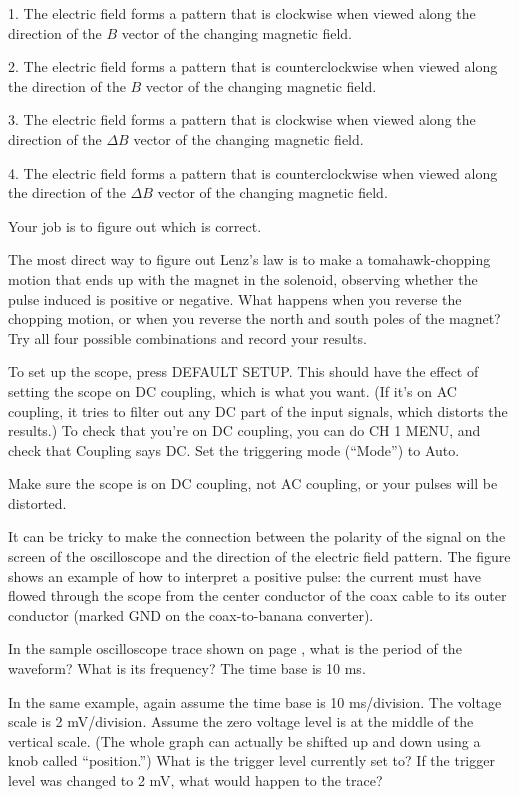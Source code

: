 1. The electric field forms a pattern that is clockwise when
viewed along the direction of the $B$ vector of the
changing magnetic field.

2. The electric field forms a pattern that is counterclockwise
when viewed along the direction of the $B$ vector of the
changing magnetic field.

3. The electric field forms a pattern that is clockwise when
viewed along the direction of the $\Delta B$ vector of the
changing magnetic field.

4. The electric field forms a pattern that is counterclockwise
when viewed along the direction of the $\Delta B$ vector of
the changing magnetic field.

Your job is to figure out which is correct.

The most direct way to figure out Lenz's law is to 
make a tomahawk-chopping motion that ends up with the magnet in the solenoid,
observing whether the pulse induced is positive or negative.
What happens when you reverse the
chopping motion, or when you reverse the north and south
poles of the magnet? Try all four possible combinations and
record your results.

To set up the scope, press DEFAULT SETUP. This should have the
effect of setting the scope on DC coupling, which is what you
want. (If it's on AC coupling, it tries to filter out any DC
part of the input signals, which distorts the results.) To check
that you're on DC coupling, you can do CH 1 MENU, and check that
Coupling says DC. Set the triggering mode (``Mode'') to Auto.

Make sure the scope is on DC coupling, not AC coupling, or your
pulses will be distorted.


It can be tricky to make the connection between the polarity
of the signal on the screen of the oscilloscope and the
direction of the electric field pattern. The figure shows an
example of how to interpret a positive pulse: the current
must have flowed through the scope from the center conductor
of the coax cable to its outer conductor (marked GND on the
coax-to-banana converter). 

\prelab

\prelabquestion  In the sample oscilloscope trace shown on
page \pageref{fig:em-osc-waveform}, what is
the period of the waveform? What is its frequency? The time base is
10 ms.

\prelabquestion  In the same example, again assume the time base is 10
ms/division. The voltage scale is 2 mV/div\-ision. Assume
the zero voltage level is at the middle of the vertical
scale. (The whole graph can actually be shifted up and down
using a knob called ``position.'')  What is the trigger
level currently set to? If the trigger level was changed to
2 mV, what would happen to the trace?

